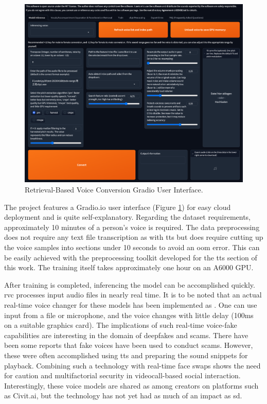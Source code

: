 \documentclass[
  a4paper,  %
  twoside,  %
  bibliography=totoc,
  headsepline,
  cleardoublepage=empty,
  parskip=half,
  draft=false
]{scrbook}
\begin{document}
\begin{figure}[h]
  \centering
  \includegraphics[width=1\textwidth]{./graphics/RVC-UI.png}
  \caption{Retrieval-Based Voice Conversion Gradio User Interface.}
  \label{fig:rvc-gradio}
\end{figure}

The project features a Gradio.io user interface (Figure \ref{fig:rvc-gradio}) for easy cloud deployment and is quite self-explanatory. Regarding the dataset requirements, approximately 10 minutes of a person's voice is required. The data preprocessing does not require any text file transcription as with \gls{tts} but does require cutting up the voice samples into sections under 10 seconds to avoid an \gls{oom} error. This can be easily achieved with the preprocessing toolkit developed for the \gls{tts} section of this work. The training itself takes approximately one hour on an A6000 GPU.

After training is completed, inferencing the model can be accomplished quickly. \gls{rvc} processes input audio files in nearly real time. It is to be noted that an actual real-time voice changer for these models has been implemented as  \cite{WokadaVoicechangerVoice}. One can use input from a file or microphone, and the voice changes with little delay (100ms on a suitable graphics card). The implications of such real-time voice-fake capabilities are interesting in the domain of deepfakes and scams. There have been some reports that fake voices have been used to conduct scams. However, these were often accomplished using \gls{tts} and preparing the sound snippets for playback. Combining such a technology with real-time face swaps shows the need for caution and multifactorial security in videocall-based social interaction. Interestingly, these voice models are shared as among creators on platforms such as Civit.ai, but the technology has not yet had as much of an impact as \gls{sd}.
\end{document}
